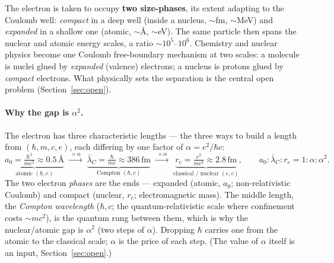 \documentclass[11pt]{article}
\begin{document}
The electron is taken to occupy \textbf{two size-phases}, its extent adapting to the Coulomb well:
\emph{compact} in a deep well (inside a nucleus, ${\sim}$fm, ${\sim}$MeV) and \emph{expanded} in a
shallow one (atomic, ${\sim}$\AA, ${\sim}$eV). The same particle then spans the nuclear and atomic
energy scales, a ratio ${\sim}10^{5}$--$10^{6}$. Chemistry and nuclear physics become one Coulomb
free-boundary mechanism at two scales: a molecule is nuclei glued by \emph{expanded} (valence)
electrons; a nucleus is protons glued by \emph{compact} electrons. What physically sets the
separation is the central open problem (Section~\ref{sec:open}).

\paragraph{Why the gap is $\alpha^2$.} The electron has three characteristic lengths --- the three ways
to build a length from $(\hbar,m,c,e)$, each differing by one factor of $\alpha=e^2/\hbar c$:
\begin{equation}
\underbrace{a_0=\tfrac{\hbar^2}{me^2}\approx0.5\,\text{\AA}}_{\text{atomic }(\hbar,e)}
\;\xrightarrow{\;\times\alpha\;}\;
\underbrace{\bar\lambda_C=\tfrac{\hbar}{mc}\approx386\,\text{fm}}_{\text{Compton }(\hbar,c)}
\;\xrightarrow{\;\times\alpha\;}\;
\underbrace{r_e=\tfrac{e^2}{mc^2}\approx2.8\,\text{fm}}_{\text{classical / nuclear }(e,c)},
\qquad a_0:\bar\lambda_C:r_e = 1:\alpha:\alpha^2 .
\end{equation}
The two electron \emph{phases} are the ends --- expanded (atomic, $a_0$; non-relativistic Coulomb) and
compact (nuclear, $r_e$; electromagnetic mass). The middle length, the \emph{Compton wavelength}
($\hbar,c$; the quantum-relativistic scale where confinement costs ${\sim}mc^2$), is the quantum rung
between them, which is why the nuclear/atomic gap is $\alpha^2$ (two steps of $\alpha$). Dropping
$\hbar$ carries one from the atomic to the classical scale; $\alpha$ is the price of each step. (The
value of $\alpha$ itself is an input, Section~\ref{sec:open}.)
\end{document}
